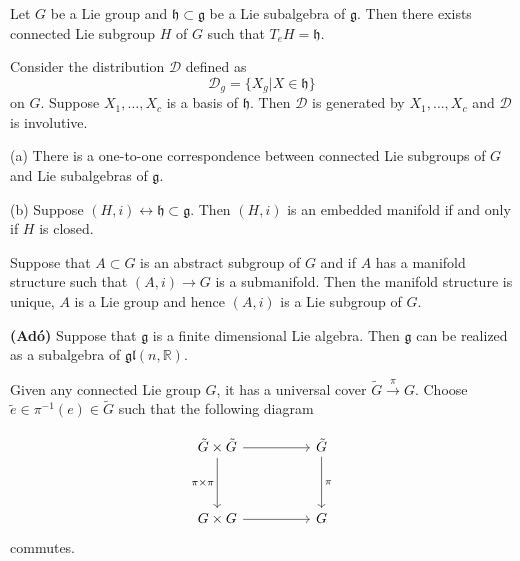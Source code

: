 \documentclass[11pt,a4paper]{scrarticle}
\theoremstyle{definition}
\renewenvironment{proof}[1][\proofname]{\vspace{-10pt}\begin{myproof}}{\end{myproof}}
\theoremstyle{greenbox}
\newcommand{\R}{\mathbb{R}}
\begin{document}
    \begin{thm}
        Let $ G $ be a Lie group and $ \mathfrak{h} \subset \mathfrak{g} $ be a Lie subalgebra of $ \mathfrak{g} $. Then there exists connected Lie subgroup $ H $ of $ G $ such that $ T_{e}H = \mathfrak{h} $.
    \end{thm}
    \begin{proof}
        Consider the distribution $ \mathscr{D} $ defined as 
        \[ \mathscr{D}_{g} = \{X_{g}| X \in \mathfrak{h} \} \]
        on $ G $. Suppose $ X_{1}, \ldots, X_{c} $ is a basis of $ \mathfrak{h} $. Then $ \mathscr{D} $ is generated by $ X_{1}, \ldots,X_{c} $ and $ \mathscr{D}  $ is involutive.
    \end{proof}
    \begin{corollary}
        (a) There is a one-to-one correspondence between connected Lie subgroups of $ G $ and Lie subalgebras of $ \mathfrak{g} $.

        (b) Suppose $ (H,i) \leftrightarrow \mathfrak{h} \subset \mathfrak{g} $. Then $ (H,i) $ is an embedded manifold if and only if $ H $ is closed.
    \end{corollary}

    \begin{thm}
        Suppose that $ A \subset G$ is an abstract subgroup of $ G $ and if $ A  $ has a manifold structure such that $ (A,i) \to G $ is a submanifold. Then the manifold structure is unique, $ A $ is a Lie group and hence $ (A,i) $ is a Lie subgroup of $ G $.
    \end{thm}
    \begin{thm}\textbf{(Ad\'o)} 
        Suppose that $ \mathfrak{g} $ is a finite dimensional Lie algebra. Then $ \mathfrak{g} $ can be realized as a  subalgebra of $ \mathfrak{gl}(n, \R) $.
    \end{thm}
    
    Given any connected Lie group $ G $, it has a universal cover $ \tilde{G} \xrightarrow{\pi} G $. Choose $ \tilde{e} \in \pi^{-1}(e) \in \tilde{G} $ such that the following diagram 

\[\begin{tikzcd}[ampersand replacement=\&]
	{\tilde{G}\times\tilde{G}} \&\& {\tilde{G}} \\
	\\
	{G \times G} \&\& G
	\arrow[from=1-1, to=1-3]
	\arrow[from=3-1, to=3-3]
	\arrow["\pi", from=1-3, to=3-3]
	\arrow["{\pi \times \pi}"', from=1-1, to=3-1]
\end{tikzcd}\] commutes.
\end{document}
